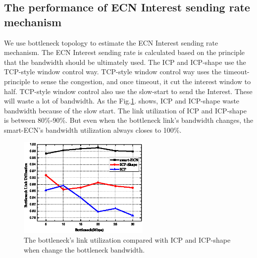 \subsection{The performance of ECN Interest sending rate mechanism}

We use bottleneck topology to estimate the ECN Interest sending rate mechanism. The ECN Interest sending rate is calculated based on the principle that the bandwidth should be ultimately used. The ICP and ICP-shape use the TCP-style window control way. TCP-style window control way uses the timeout-principle to sense the congestion, and once timeout, it cut the interest window to half. TCP-style window control also use the slow-start to send the Interest. These will waste a lot of bandwidth. As the Fig.\ref{fig-linkuti}. shows, ICP and ICP-shape waste bandwidth because of the slow start. The link utilization of ICP and ICP-shape is between 80\%-90\%. But even when the bottleneck link's bandwidth changes, the smart-ECN's bandwidth utilization always closes to 100\%.
\begin{figure}[t]
\centering
\includegraphics[width=2.5in]{utilization-pic-cut.eps}
\centering
\caption{The bottleneck's link utilization compared with ICP and ICP-shape when change the bottleneck bandwidth.}
\label{fig-linkuti}
\end{figure}

